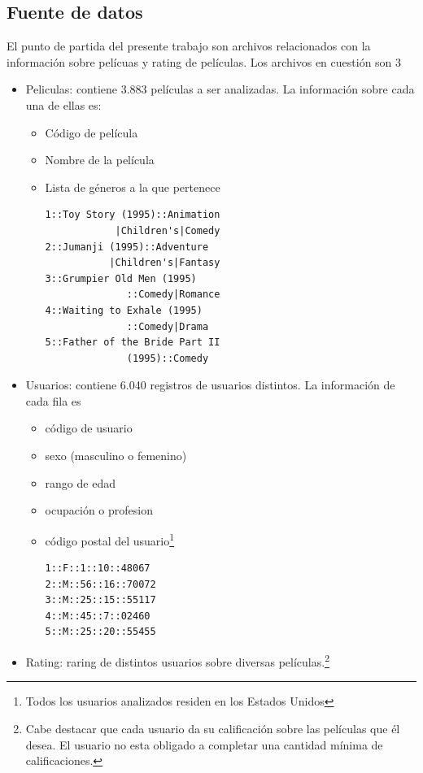 \documentclass[journal]{IEEEtran}
\begin{document}
\subsection{Fuente de datos}
El punto de partida del presente trabajo son  archivos relacionados con la información
sobre pelícuas y rating de películas. Los archivos en cuestión son 3
\begin{itemize}
	\item Peliculas: contiene 3.883 películas a ser analizadas. La información sobre cada
		una de ellas es:
		\begin{itemize}
			\item Código de película
			\item Nombre de la película
			\item Lista de géneros a la que pertenece
				\begin{lstlisting}[frame=single]
1::Toy Story (1995)::Animation
            |Children's|Comedy
2::Jumanji (1995)::Adventure
           |Children's|Fantasy
3::Grumpier Old Men (1995)
              ::Comedy|Romance
4::Waiting to Exhale (1995)
              ::Comedy|Drama
5::Father of the Bride Part II 
              (1995)::Comedy
				\end{lstlisting}
		\end{itemize}


	\item Usuarios: contiene 6.040 registros de usuarios distintos. La información de cada
		fila es
		\begin{itemize}
			\item código de usuario
			\item sexo (masculino o femenino)
			\item rango de edad
			\item ocupación o profesion
			\item código postal del usuario\footnote{Todos los usuarios analizados residen 
			  en los Estados Unidos}
				\begin{lstlisting}[frame=single]
1::F::1::10::48067
2::M::56::16::70072
3::M::25::15::55117
4::M::45::7::02460
5::M::25::20::55455
				\end{lstlisting}
		\end{itemize}

	\item Rating: raring de distintos usuarios sobre diversas películas.\footnote{Cabe
		destacar que cada usuario da su calificación sobre las películas que él desea. El
		usuario no esta obligado a completar una cantidad mínima de calificaciones.}


\end{itemize}
\end{document}

